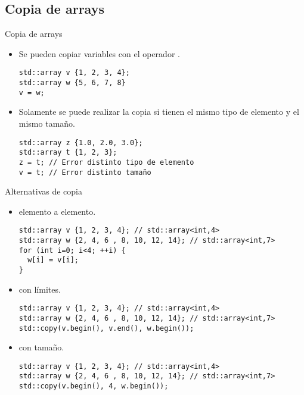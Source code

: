 \subsection{Copia de arrays}

\begin{frame}[t,fragile]{Copia de arrays}
\begin{itemize}
  \item Se pueden copiar variables  con el operador \cppkey{=}.
\begin{lstlisting}
std::array v {1, 2, 3, 4};
std::array w {5, 6, 7, 8}
v = w;
\end{lstlisting}

  \item Solamente se puede realizar la copia si tienen el mismo tipo de elemento
        y el mismo tamaño.
\begin{lstlisting}
std::array z {1.0, 2.0, 3.0};
std::array t {1, 2, 3};
z = t; // Error distinto tipo de elemento
v = t; // Error distinto tamaño
\end{lstlisting}
\end{itemize}
\end{frame}

\begin{frame}[t,fragile]{Alternativas de copia}
\begin{itemize}
  \item {} elemento a elemento.
\begin{lstlisting}
std::array v {1, 2, 3, 4}; // std::array<int,4>
std::array w {2, 4, 6 , 8, 10, 12, 14}; // std::array<int,7>
for (int i=0; i<4; ++i) {
  w[i] = v[i];
}
\end{lstlisting}

  \item {} con límites.
\begin{lstlisting}
std::array v {1, 2, 3, 4}; // std::array<int,4>
std::array w {2, 4, 6 , 8, 10, 12, 14}; // std::array<int,7>
std::copy(v.begin(), v.end(), w.begin());
\end{lstlisting}

  \item {} con tamaño.
\begin{lstlisting}
std::array v {1, 2, 3, 4}; // std::array<int,4>
std::array w {2, 4, 6 , 8, 10, 12, 14}; // std::array<int,7>
std::copy(v.begin(), 4, w.begin());
\end{lstlisting}
\end{itemize}
\end{frame}

